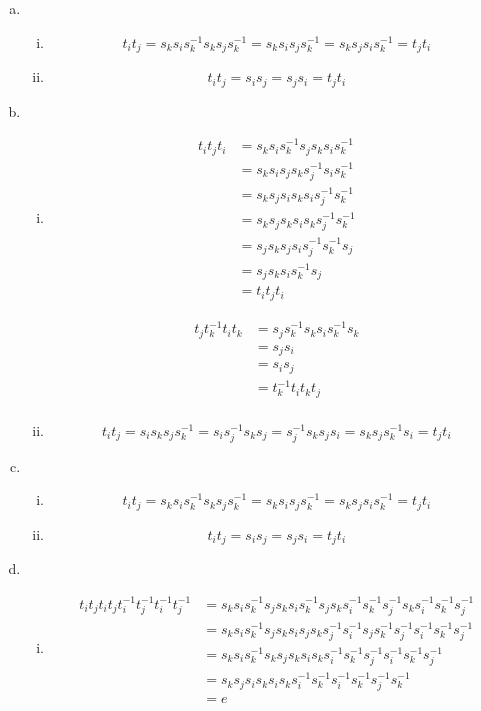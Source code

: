 \documentclass[11pt]{amsart}
\theoremstyle{definition}
\begin{document}
\begin{enumerate}[a)]
\item
\begin{enumerate}[i)]
\item $$t_it_j = s_ks_is_k^{-1}s_ks_js_k^{-1} = s_ks_is_js_k^{-1} = s_ks_js_is_k^{-1} = t_jt_i$$
\item $$t_it_j = s_is_j = s_js_i = t_jt_i$$
\end{enumerate}
\item
\begin{enumerate}[i)]
\item
\begin{align*}
t_it_jt_i &= s_ks_is_k^{-1}s_js_ks_is_k^{-1}\\
&= s_ks_is_js_ks_j^{-1}s_is_k^{-1}\\
&= s_ks_js_is_ks_is_j^{-1}s_k^{-1}\\
&= s_ks_js_ks_is_ks_j^{-1}s_k^{-1}\\
&= s_js_ks_js_is_j^{-1}s_k^{-1}s_j\\
&= s_js_ks_is_k^{-1}s_j\\
&= t_it_jt_i
\end{align*}

\begin{align*}
t_jt_k^{-1}t_it_k &= s_js_k^{-1}s_ks_is_k^{-1}s_k\\
&= s_js_i\\
&= s_is_j\\
&= t_k^{-1}t_it_kt_j\\
\end{align*}

\item $$t_it_j = s_is_ks_js_k^{-1} = s_is_j^{-1}s_ks_j = s_j^{-1}s_ks_js_i = s_ks_js_k^{-1}s_i = t_jt_i$$
\end{enumerate}
\item
\begin{enumerate}[i)]
\item $$t_it_j = s_ks_is_k^{-1}s_ks_js_k^{-1} = s_ks_is_js_k^{-1} = s_ks_js_is_k^{-1} = t_jt_i$$
\item $$t_it_j = s_is_j = s_js_i = t_jt_i$$
\end{enumerate}
\item
\begin{enumerate}[i)]
\item
\begin{align*}
t_it_jt_it_jt_i^{-1}t_j^{-1}t_i^{-1}t_j^{-1} &= s_ks_is_k^{-1}s_js_ks_is_k^{-1}s_js_ks_i^{-1}s_k^{-1}s_j^{-1}s_ks_i^{-1}s_k^{-1}s_j^{-1}\\
&=s_ks_is_k^{-1}s_js_ks_is_js_ks_j^{-1}s_i^{-1}s_js_k^{-1}s_j^{-1}s_i^{-1}s_k^{-1}s_j^{-1}\\
&=s_ks_is_k^{-1}s_ks_js_ks_is_ks_i^{-1}s_k^{-1}s_j^{-1}s_i^{-1}s_k^{-1}s_j^{-1}\\
&=s_ks_js_is_ks_is_ks_i^{-1}s_k^{-1}s_i^{-1}s_k^{-1}s_j^{-1}s_k^{-1}\\
&= e
\end{align*}


\end{enumerate}
\end{enumerate}
\end{document}
